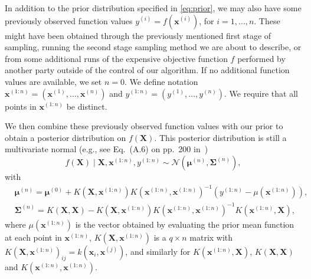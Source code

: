 \documentclass[paper=letter]{scrartcl}
\newcommand{\x}[1]{\bm{x}^{(#1)}}
\newcommand{\bmu}[1]{\bm{\mu}^{(#1)}}
\newcommand{\y}[1]{y^{(#1)}}
\newcommand{\Sig}[1]{\bm{\Sigma}^{(#1)}} %
\begin{document}





In addition to the prior distribution specified in \eqref{eq:prior}, we may also have some
previously observed function values $\y{i}=f(\x{i})$, for $i=1,\ldots,n$.
These might have been obtained through the previously mentioned first stage of
sampling, running the second stage sampling method we are about to describe,
or from some additional runs of the expensive objective function $f$ performed
by another party outside of the control of our algorithm.  If no additional
function values are available, we set $n=0$.
We define notation $\x{1:n} = (\x{1},\ldots,\x{n})$ and $\y{1:n} = (\y{1},\ldots,\y{n})$.
We require that all points in $\x{1:n}$ be distinct.

We then combine these previously observed function values with our prior to
obtain a posterior distribution on $f(\bm{X})$.  This posterior distribution is still a
multivariate normal (e.g., see Eq.~(A.6) on pp.~200 in~\citealt{RaWi06})
\begin{equation}
    f(\bm{X}) \mid \bm{X}, \x{1:n}, \y{1:n} \sim \mathcal{N} (\bmu{n}, \Sig{n}),
\label{eq:posterior}
\end{equation}
with
\begin{equation}
\begin{split}
&\bmu{n} = \bmu{0} + K\left(\bm{X},\x{1:n}\right) K\left(\x{1:n},\x{1:n}\right)^{-1}  \left(\y{1:n} - \mu(\x{1:n}) \right), \\
&\Sig{n} = K\left(\bm{X},\bm{X}\right) - K\left(\bm{X},\x{1:n}\right)  K\left(\x{1:n},\x{1:n}\right)^{-1} K\left(\x{1:n},\bm{X}\right),
\end{split}
\label{eq:posterior_detail}
\end{equation}
where $\mu(\x{1:n})$ is the vector obtained by evaluating the prior mean function at each point in $\x{1:n}$, $K\left(\bm{X}, \bm{x}^{(1:n)}\right)$ is a $q \times n$ matrix with 
$K\left(\bm{X}, \bm{x}^{(1:n)}\right)_{ij} = k(\bm{x}_i, \bm{x}^{(j)})$, and similarly for 
$K\left(\bm{x}^{(1:n)}, \bm{X}\right)$, $K\left(\bm{X}, \bm{X}\right)$ and $K\left(\bm{x}^{(1:n)}, \bm{x}^{(1:n)}\right)$.
\end{document}
